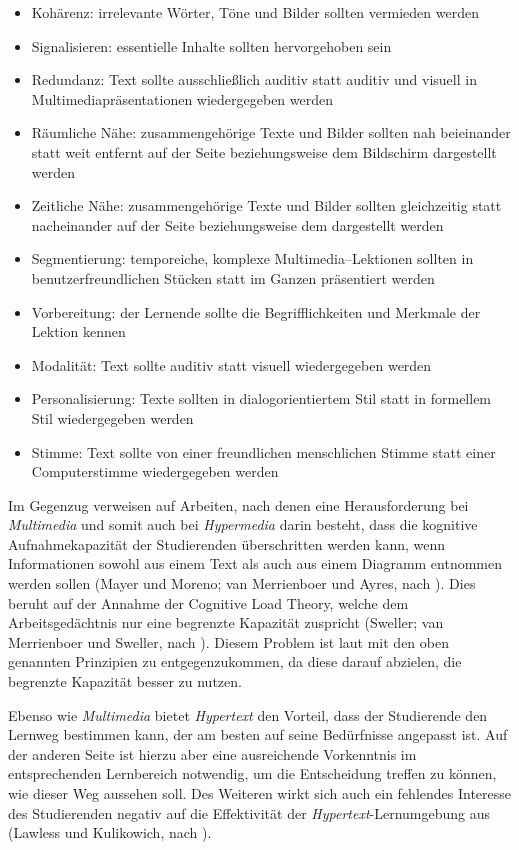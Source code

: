 \begin{itemize}
 \item  Kohärenz: irrelevante Wörter, Töne und Bilder sollten vermieden werden
 \item	Signalisieren: essentielle Inhalte sollten hervorgehoben sein
 \item	Redundanz: Text sollte ausschließlich auditiv statt auditiv und visuell in Multimediapräsentationen wiedergegeben werden
 \item	Räumliche Nähe: zusammengehörige Texte und Bilder sollten nah beieinander statt weit entfernt auf der Seite beziehungsweise dem Bildschirm dargestellt werden
 \item	Zeitliche Nähe: zusammengehörige Texte und Bilder sollten gleichzeitig statt nacheinander auf der Seite beziehungsweise dem dargestellt werden
 \item	Segmentierung: temporeiche, komplexe Multimedia–Lektionen sollten in benutzerfreundlichen Stücken statt im Ganzen präsentiert werden
 \item	Vorbereitung: der Lernende sollte die Begrifflichkeiten und Merkmale der Lektion kennen
 \item	Modalität: Text sollte auditiv statt visuell wiedergegeben werden
 \item	Personalisierung: Texte sollten in dialogorientiertem Stil statt in formellem Stil wiedergegeben werden
 \item	Stimme: Text sollte von einer freundlichen menschlichen Stimme statt einer Computerstimme wiedergegeben werden
\end{itemize}

Im Gegenzug verweisen \cite{moos2010multimedia} auf Arbeiten, nach denen eine Herausforderung bei \textit{Multimedia} und somit auch bei \textit{Hypermedia} darin besteht, dass die kognitive Aufnahmekapazität der Studierenden überschritten werden kann, wenn Informationen sowohl aus einem Text als auch aus einem Diagramm entnommen werden sollen (Mayer und Moreno; van Merrienboer und Ayres, nach \cite{moos2010multimedia}). Dies beruht auf der Annahme der Cognitive Load Theory, welche dem Arbeitsgedächtnis nur eine begrenzte Kapazität zuspricht (Sweller; van Merrienboer und Sweller, nach \cite{moos2010multimedia}). Diesem Problem ist laut \cite{mayer2009multimedia} mit den oben genannten Prinzipien zu entgegenzukommen, da diese darauf abzielen, die begrenzte Kapazität besser zu nutzen.

Ebenso wie \textit{Multimedia} bietet \textit{Hypertext} den Vorteil, dass der Studierende den Lernweg bestimmen kann, der am besten auf seine Bedürfnisse angepasst ist. Auf der anderen Seite ist hierzu aber eine ausreichende Vorkenntnis im entsprechenden Lernbereich notwendig, um die Entscheidung treffen zu können, wie dieser Weg aussehen soll. Des Weiteren wirkt sich auch ein fehlendes Interesse des Studierenden negativ auf die Effektivität der \textit{Hypertext}-Lernumgebung aus (Lawless und Kulikowich, nach \cite{moos2010multimedia}).

